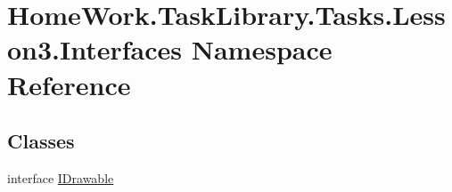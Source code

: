 \hypertarget{namespace_home_work_1_1_task_library_1_1_tasks_1_1_lesson3_1_1_interfaces}{}\section{Home\+Work.\+Task\+Library.\+Tasks.\+Lesson3.\+Interfaces Namespace Reference}
\label{namespace_home_work_1_1_task_library_1_1_tasks_1_1_lesson3_1_1_interfaces}
\subsection*{Classes}
\begin{DoxyCompactItemize}
\item 
interface \mbox{\hyperlink{interface_home_work_1_1_task_library_1_1_tasks_1_1_lesson3_1_1_interfaces_1_1_i_drawable}{I\+Drawable}}
\end{DoxyCompactItemize}
